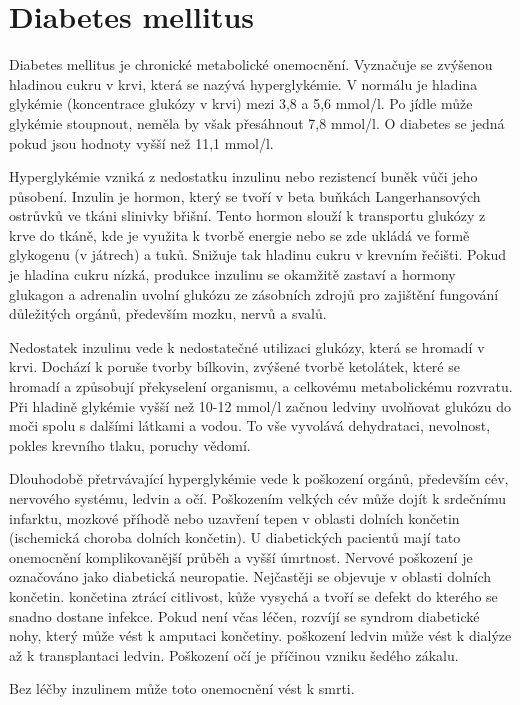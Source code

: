 \chapter{Diabetes mellitus}

Diabetes mellitus je chronické metabolické onemocnění. Vyznačuje se zvýšenou hladinou cukru v krvi, která se nazývá hyperglykémie. V normálu je hladina glykémie (koncentrace glukózy v krvi) mezi 3,8 a 5,6 mmol/l. Po jídle může glykémie stoupnout, neměla by však přesáhnout 7,8 mmol/l. O diabetes se jedná pokud jsou hodnoty vyšší než 11,1 mmol/l.

Hyperglykémie vzniká z nedostatku inzulinu nebo rezistencí buněk vůči jeho působení. Inzulin je hormon, který se tvoří v beta buňkách Langerhansových ostrůvků ve tkáni slinivky břišní. Tento hormon slouží k transportu glukózy z krve do tkáně, kde je využita k tvorbě energie nebo se zde ukládá ve formě glykogenu (v játrech) a tuků. Snižuje tak hladinu cukru v krevním řečišti. Pokud je hladina cukru nízká, produkce inzulinu se okamžitě zastaví  a hormony glukagon a adrenalin uvolní glukózu ze zásobních zdrojů pro zajištění fungování důležitých orgánů, především mozku, nervů a svalů.

Nedostatek inzulinu vede k nedostatečné utilizaci glukózy, která se hromadí v krvi. Dochází k poruše tvorby bílkovin, zvýšené tvorbě ketolátek, které se hromadí a způsobují překyselení organismu, a celkovému metabolickému rozvratu. Při hladině glykémie vyšší než 10-12 mmol/l začnou ledviny uvolňovat glukózu do moči spolu s dalšími látkami a vodou. To vše vyvolává dehydrataci, nevolnost, pokles krevního tlaku, poruchy vědomí.

Dlouhodobě přetrvávající hyperglykémie vede k poškození orgánů, především cév, nervového systému, ledvin a očí. Poškozením velkých cév může dojít k srdečnímu infarktu, mozkové příhodě nebo uzavření tepen v oblasti dolních končetin (ischemická choroba dolních končetin). U diabetických pacientů mají tato onemocnění komplikovanější průběh a vyšší úmrtnost. Nervové poškození je označováno jako diabetická neuropatie. Nejčastěji se objevuje v oblasti dolních končetin. končetina ztrácí citlivost, kůže vysychá a tvoří se defekt do kterého se snadno dostane infekce. Pokud není včas léčen, rozvíjí se syndrom diabetické nohy, který může vést k amputaci končetiny. poškození ledvin může vést k dialýze až k transplantaci ledvin. Poškození očí je příčinou vzniku šedého zákalu.

Bez léčby inzulinem může toto onemocnění vést k smrti. \cite{Diabetes.Psottova,Diabetes.TaiN} %


